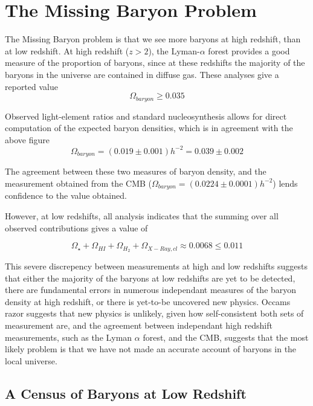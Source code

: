 \chapter{The Missing Baryon Problem}

The Missing Baryon problem is that we see more baryons at high redshift, than at low redshift. At high redshift ($z>2$), the Lyman-$\alpha$ forest provides a good measure of the proportion of baryons, since at these redshifts the majority of the baryons in the universe are contained in diffuse gas. These analyses give a reported value 
$$\Omega_{baryon} \geq 0.035 $$ 

Observed light-element ratios and standard nucleosynthesis allows for direct computation of the expected baryon densities, which is in agreement with the above figure \citep{1998sese.conf..113B}
$$\Omega_{baryon} = (0.019\pm 0.001)h^{-2} = 0.039 \pm 0.002 $$

The agreement between these two measures of baryon density, and the measurement obtained from the CMB ($\Omega_{baryon} = (0.0224 \pm 0.0001) h^{-2}$) lends confidence to the value obtained. 

\par However, at low redshifts, all analysis indicates that the summing over all observed contributions gives a value of 

$$\Omega_\star + \Omega_{HI} + \Omega_{H_2} + \Omega_{X-Ray,cl} \approx 0.0068 \leq 0.011 $$

This severe discrepency between measurements at high and low redshifts suggests that either the majority of the baryons at low redshifts are yet to be detected, there are fundamental errors in numerous independant measures of the baryon density at high redshift, or there is yet-to-be uncovered new physics. Occams razor suggests that new physics is unlikely, given how self-consistent both sets of measurement are, and the agreement between independant high redshift measurements, such as the Lyman $\alpha$ forest, and the CMB, suggests that the most likely problem is that we have not made an accurate account of baryons in the local universe.

\section{A Census of Baryons at Low Redshift}
